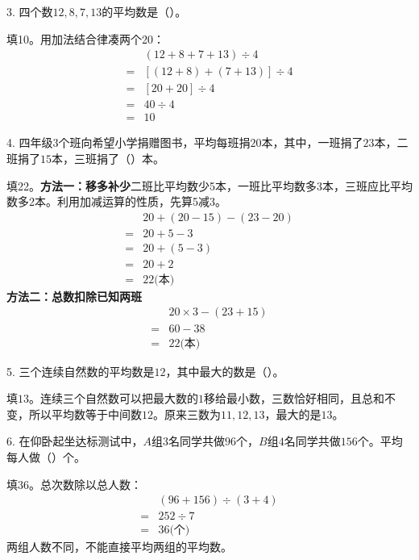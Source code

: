 3. 四个数\(12,8,7,13\)的平均数是（\hspace{1.8em}）。\par
\begin{BookAnswer}
填10。用加法结合律凑两个20：\[\begin{aligned}&(12+8+7+13)\div4\\={}&[(12+8)+(7+13)]\div4\\={}&[20+20]\div4\\={}&40\div4\\={}&10\end{aligned}\]
\end{BookAnswer}

4. 四年级\(3\)个班向希望小学捐赠图书，平均每班捐\(20\)本，其中，一班捐了\(23\)本，二班捐了\(15\)本，三班捐了（\hspace{1.8em}）本。\par
\begin{BookAnswer}
填22。\textbf{方法一：移多补少}二班比平均数少5本，一班比平均数多3本，三班应比平均数多2本。利用加减运算的性质，先算5减3。\[\begin{aligned}&20+(20-15)-(23-20)\\={}&20+5-3\\={}&20+(5-3)\\={}&20+2\\={}&22\text{(本)}\end{aligned}\]\textbf{方法二：总数扣除已知两班}\[\begin{aligned}&20\times3-(23+15)\\={}&60-38\\={}&22\text{(本)}\end{aligned}\]
\end{BookAnswer}

5. 三个连续自然数的平均数是\(12\)，其中最大的数是（\hspace{1.8em}）。\par
\begin{BookAnswer}
填\(13\)。连续三个自然数可以把最大数的\(1\)移给最小数，三数恰好相同，且总和不变，所以平均数等于中间数\(12\)。原来三数为\(11,12,13\)，最大的是\(13\)。
\end{BookAnswer}

6. 在仰卧起坐达标测试中，\allowbreak{}\(A\)组\(3\)名同学共做\(96\)个，\allowbreak{}\(B\)组\(4\)名同学共做\(156\)个。平均每人做（\hspace{1.8em}）个。\par
\begin{BookAnswer}
填36。总次数除以总人数：\[\begin{aligned}&(96+156)\div(3+4)\\={}&252\div7\\={}&36\text{(个)}\end{aligned}\]两组人数不同，不能直接平均两组的平均数。
\end{BookAnswer}

